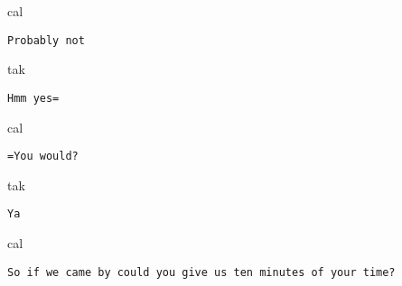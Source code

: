 \documentclass[output=paper,nonflat,colorlinks,citecolor=brown]{langsci/langscibook}
\begin{document}
\begin{transbox}{4}{cal}
\begin{verbatim}
Probably not
\end{verbatim}
\end{transbox}

\begin{transbox}{5}{tak}
\begin{verbatim}
Hmm yes=
\end{verbatim}
\end{transbox}

\begin{transbox}{6}{cal}
\begin{verbatim}
=You would?
\end{verbatim}
\end{transbox}

\begin{transbox}{7}{tak}
\begin{verbatim}
Ya
\end{verbatim}
\end{transbox}

\begin{transbox}{8}{cal}
\begin{verbatim}
So if we came by could you give us ten minutes of your time?
\end{verbatim}
\end{transbox}\\

\end{document}
